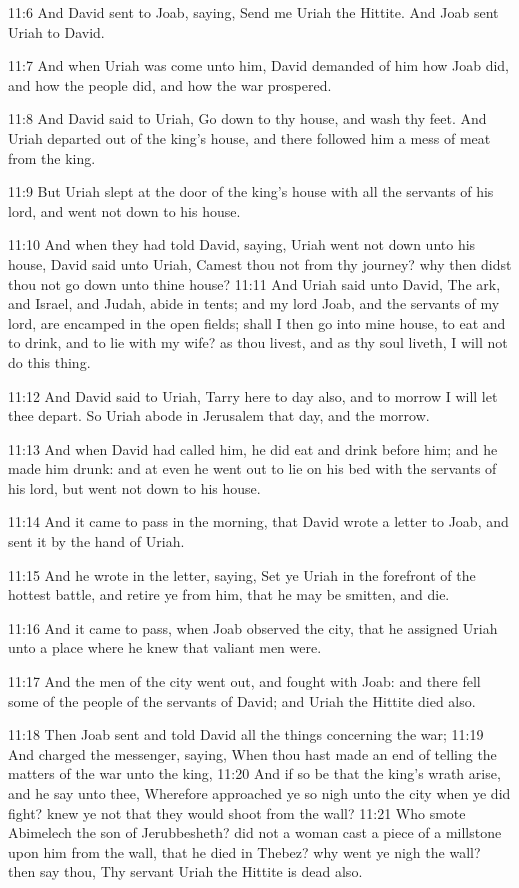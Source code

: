 11:6 And David sent to Joab, saying, Send me Uriah the Hittite. And Joab sent Uriah to David.

11:7 And when Uriah was come unto him, David demanded of him how Joab did, and how the people did, and how the war prospered.

11:8 And David said to Uriah, Go down to thy house, and wash thy feet.  And Uriah departed out of the king's house, and there followed him a mess of meat from the king.

11:9 But Uriah slept at the door of the king's house with all the servants of his lord, and went not down to his house.

11:10 And when they had told David, saying, Uriah went not down unto his house, David said unto Uriah, Camest thou not from thy journey?  why then didst thou not go down unto thine house?  11:11 And Uriah said unto David, The ark, and Israel, and Judah, abide in tents; and my lord Joab, and the servants of my lord, are encamped in the open fields; shall I then go into mine house, to eat and to drink, and to lie with my wife? as thou livest, and as thy soul liveth, I will not do this thing.

11:12 And David said to Uriah, Tarry here to day also, and to morrow I will let thee depart. So Uriah abode in Jerusalem that day, and the morrow.

11:13 And when David had called him, he did eat and drink before him; and he made him drunk: and at even he went out to lie on his bed with the servants of his lord, but went not down to his house.

11:14 And it came to pass in the morning, that David wrote a letter to Joab, and sent it by the hand of Uriah.

11:15 And he wrote in the letter, saying, Set ye Uriah in the forefront of the hottest battle, and retire ye from him, that he may be smitten, and die.

11:16 And it came to pass, when Joab observed the city, that he assigned Uriah unto a place where he knew that valiant men were.

11:17 And the men of the city went out, and fought with Joab: and there fell some of the people of the servants of David; and Uriah the Hittite died also.

11:18 Then Joab sent and told David all the things concerning the war; 11:19 And charged the messenger, saying, When thou hast made an end of telling the matters of the war unto the king, 11:20 And if so be that the king's wrath arise, and he say unto thee, Wherefore approached ye so nigh unto the city when ye did fight? knew ye not that they would shoot from the wall?  11:21 Who smote Abimelech the son of Jerubbesheth? did not a woman cast a piece of a millstone upon him from the wall, that he died in Thebez? why went ye nigh the wall? then say thou, Thy servant Uriah the Hittite is dead also.


